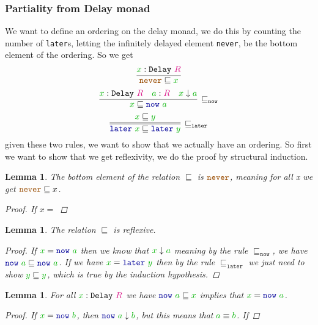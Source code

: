 \documentclass[twoside,11pt,openright]{report}
\theoremstyle{plain} %
\newtheorem{lem}[thm]{Lemma}
\theoremstyle{definition}
\theoremstyle{remark}
\newcommand*{\term}[1]{\textcolor{green!70!black}{#1}} %
\newcommand*{\type}[1]{\textcolor{magenta!90!black}{#1}}
\newcommand*{\constant}[1]{\textcolor{orange!60!black}{\ensuremath{\mathtt{#1}}}}
\newcommand*{\function}[1]{\textcolor{blue!60!black}{\ensuremath{\mathtt{#1}}}}
\newcommand*{\typeformer}[1]{\ensuremath{\mathtt{#1}}}
\begin{document}
\subsubsection{Partiality from Delay monad}
We want to define an ordering on the delay monad, we do this by counting the number of \texttt{later}s, letting the infinitely delayed element \texttt{never}, be the bottom element of the ordering. So we get
\begin{equation}
  \infer{\constant{never} \sqsubseteq \term{x}}{\term{x} : \typeformer{Delay}~\type{R}}
\end{equation}
\begin{equation}
  \infer[\sqsubseteq_{\mathtt{now}}]{\term{x} \sqsubseteq \function{now}~\term{a}}{\term{x} : \typeformer{Delay}~\type{R} & \term{a} : \type{R} & \term{x} \downarrow \term{a}}
\end{equation}
\begin{equation}
  \infer=[\sqsubseteq_{\mathtt{later}}]{\function{later}~\term{x} \sqsubseteq \function{later}~\term{y}}{\term{x} \sqsubseteq \term{y}}
\end{equation}
given these two rules, we want to show that we actually have an ordering. So first we want to show that we get reflexivity, we do the proof by structural induction.

\begin{lem}
  The bottom element of the relation \(\sqsubseteq\) is \(\constant{never}\), meaning for all x we get \(\constant{never} \sqsubseteq x\).
  \begin{proof}
    If \(x = \)
  \end{proof}
\end{lem}
  
\begin{lem}
  The relation \(\sqsubseteq\) is reflexive.
  \begin{proof}
    If \(\term{x} = \function{now}~\term{a}\) then we know that \(\term{x} \downarrow \term{a}\) meaning by the rule \(\sqsubseteq_{\mathtt{now}}\), we have \(\function{now}~\term{a} \sqsubseteq \function{now}~\term{a}\). If we have \(\term{x} = \function{later}~\term{y}\) then by the rule \(\sqsubseteq_{\mathtt{later}}\) we just need to show \(\term{y} \sqsubseteq \term{y}\), which is true by the induction hypothesis.
  \end{proof}
\end{lem}

\begin{lem}
  For all \(\term{x} : \typeformer{Delay}~\type{R}\) we have \(\function{now}~\term{a} \sqsubseteq \term{x}\) implies that \(\term{x} = \function{now}~\term{a}\).
  \begin{proof}
    If \(\term{x} = \function{now}~\term{b}\), then \(\function{now}~\term{a} \downarrow \term{b}\), but this means that \(\term{a} \equiv \term{b}\). If 
  \end{proof}
\end{lem}
\end{document}
